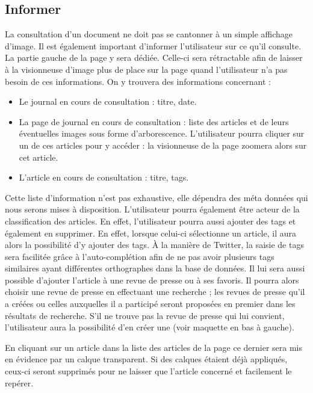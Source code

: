\subsection{Informer}
\label{sec:consultation_informer}
	La consultation d’un document ne doit pas se cantonner à un simple affichage d’image. Il est également important d’informer l’utilisateur sur ce qu’il consulte. La partie gauche de la page y sera dédiée. Celle-ci sera rétractable afin de laisser à la visionneuse d'image plus de place sur la page quand l'utilisateur n'a pas besoin de ces informations.
On y trouvera des informations concernant :
\begin{itemize}
\item Le journal en cours de consultation : titre, date.
\item La page de journal en cours de consultation : liste des articles et de leurs éventuelles images sous forme d'arborescence. L'utilisateur pourra cliquer sur un de ces articles pour y accéder : la visionneuse de la page zoomera alors sur cet article.
\item L’article en cours de consultation : titre, tags.
\end{itemize}
\bigskip
\par
	Cette liste d’information n’est pas exhaustive, elle dépendra des méta données qui nous serons mises à disposition.
	L’utilisateur pourra également être acteur de la classification des articles. En effet, l'utilisateur pourra aussi ajouter des tags et également en supprimer. En effet, lorsque celui-ci sélectionne un article, il aura alors la possibilité d'y ajouter des tags. À la manière de Twitter, la saisie de tags sera facilitée grâce à l'auto-complétion afin de ne pas avoir plusieurs tags similaires ayant différentes orthographes dans la base de données. Il lui sera aussi possible d’ajouter l’article à une revue de presse ou à ses favoris. Il pourra alors choisir une revue de presse en effectuant une recherche ; les revues de presse qu’il a créées ou celles auxquelles il a participé seront proposées en premier dans les résultats de recherche. S’il ne trouve pas la revue de presse qui lui convient, l’utilisateur aura la possibilité d’en créer une (voir maquette en bas à gauche). 

	En cliquant sur un article dans la liste des articles de la page ce dernier sera mis en évidence par un calque transparent. Si des calques étaient déjà appliqués, ceux-ci seront supprimés pour ne laisser que l'article concerné et facilement le repérer.

